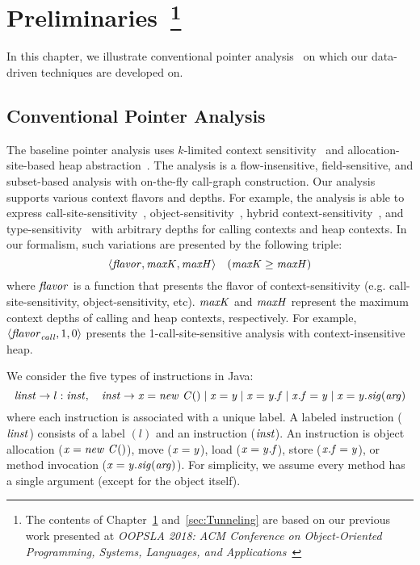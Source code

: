 \chapter{Preliminaries~\footnote{The contents of Chapter~\ref{sec:Preliminaries} and~\ref{sec:Tunneling} are based on our previous work presented at \emph{OOPSLA 2018: ACM Conference on Object-Oriented Programming, Systems, Languages, and Applications}~\cite{JeJeOh18}}}\label{sec:Preliminaries}
In this chapter, we illustrate conventional pointer analysis~\cite{Smaragdakis2015,KastrinisS13a} on which our data-driven techniques are developed on.



\section{Conventional Pointer Analysis}\label{pre:conventional-analysis}
The baseline pointer analysis uses $k$-limited context sensitivity~\cite{KastrinisS13a,Smaragdakis2011} and allocation-site-based heap abstraction~\cite{Smaragdakis2015,Tan2017}.
The analysis is a flow-insensitive, field-sensitive, and subset-based
analysis with on-the-fly call-graph construction. 
Our analysis supports various context flavors and depths.
For example, the analysis is able to express
call-site-sensitivity~\cite{Shivers1988},
object-sensitivity~\cite{Milanova2005}, hybrid
context-sensitivity~\cite{KastrinisS13a}, and
type-sensitivity~\cite{Smaragdakis2011} with arbitrary depths for
calling contexts and heap contexts. In our formalism, such variations
are presented by the following triple:
\[
  \langle {\it flavor}, {\it maxK}, {\it maxH} \rangle \quad ({\it maxK} \ge {\it maxH})
\]
where ${\it flavor}$ is a function that presents the flavor of
context-sensitivity (e.g. call-site-sensitivity, object-sensitivity,
etc). ${\it maxK}$ and ${\it maxH}$ represent the maximum context depths
of calling and heap contexts, respectively. For example,
$\langle {\it flavor}_{\it call}, 1, 0 \rangle$ presents the 1-call-site-sensitive
analysis with context-insensitive heap. 


We consider the five types of instructions in Java:
\[
  {\it linst} \to l: {\it inst}, \quad {\it inst} \to {\it x = new~C()} \mid {\it x = y}
  \mid {\it x = y.f} \mid {\it x.f = y} \mid {\it x = y.sig(arg)}
\]
where each instruction is associated with a unique label.  A labeled
instruction (${\it linst}$) consists of a label $(l)$ and an instruction
(${\it inst}$). An instruction is object allocation (${\it x = new~C()}$),
move (${\it x = y}$), load (${\it x=y.{\it f}}$), store
(${\it x.{\it f} = y}$), or method invocation (${\it
  x=y.{\it sig}(arg)}$). For simplicity, we assume every method has a
single argument (except for the object itself).

